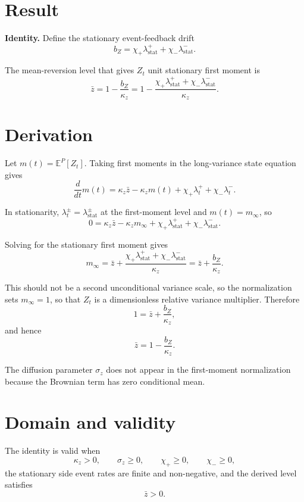 \documentclass[11pt]{article}
\begin{document}
\section{Result}

\noindent\textbf{Identity.} Define the stationary event-feedback drift
\[
    b_Z
    =
    \chi_+\lambda_{\mathrm{stat}}^+
    +\chi_-\lambda_{\mathrm{stat}}^-.
\]

The mean-reversion level that gives \(Z_t\) unit stationary first moment is
\[
    \bar z
    =
    1-\frac{b_Z}{\kappa_z}
    =
    1-
    \frac{
        \chi_+\lambda_{\mathrm{stat}}^+
        +\chi_-\lambda_{\mathrm{stat}}^-
    }{\kappa_z}.
\]

\section{Derivation}

Let \(m(t)=\mathbb E^P[Z_t]\).
Taking first moments in the long-variance state
equation gives
\[
    \frac{d}{dt}m(t)
    =
    \kappa_z\bar z
    -\kappa_z m(t)
    +\chi_+\lambda_t^+
    +\chi_-\lambda_t^-.
\]

In stationarity, \(\lambda_t^\pm=\lambda_{\mathrm{stat}}^\pm\) at the
first-moment level and \(m(t)=m_\infty\), so
\[
    0
    =
    \kappa_z\bar z
    -\kappa_z m_\infty
    +\chi_+\lambda_{\mathrm{stat}}^+
    +\chi_-\lambda_{\mathrm{stat}}^-.
\]

Solving for the stationary first moment gives
\[
    m_\infty
    =
    \bar z
    +
    \frac{
        \chi_+\lambda_{\mathrm{stat}}^+
        +\chi_-\lambda_{\mathrm{stat}}^-
    }{\kappa_z}
    =
    \bar z+\frac{b_Z}{\kappa_z}.
\]

This should not be a second unconditional variance scale,
so the normalization sets \(m_\infty=1\), so that \(Z_t\) is a dimensionless
relative variance multiplier.
Therefore
\[
    1
    =
    \bar z+\frac{b_Z}{\kappa_z},
\]
and hence
\[
    \bar z
    =
    1-\frac{b_Z}{\kappa_z}.
\]

The diffusion parameter \(\sigma_z\) does not appear in the first-moment
normalization because the Brownian term has zero conditional mean.

\section{Domain and validity}

The identity is valid when
\[
    \kappa_z>0,\qquad
    \sigma_z\ge 0,\qquad
    \chi_+\ge 0,\qquad
    \chi_-\ge 0,
\]
the stationary side event rates are finite and non-negative, and the derived
level satisfies
\[
    \bar z>0.
\]
\end{document}
